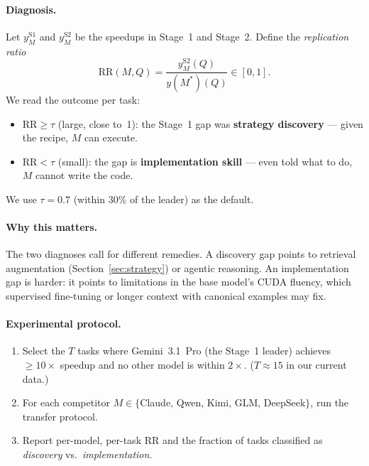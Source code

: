 \documentclass{article}
\begin{document}
\paragraph{Diagnosis.} Let $y^{\mathrm{S1}}_{M}$ and
$y^{\mathrm{S2}}_{M}$ be the speedups in Stage~1 and Stage~2. Define
the \emph{replication ratio}
\begin{equation}
\mathrm{RR}(M, Q) = \frac{y^{\mathrm{S2}}_{M}(Q)}{y(M^*)(Q)}
  \in [0, 1].
\label{eq:rr}
\end{equation}
We read the outcome per task:
\begin{itemize}
  \item $\mathrm{RR} \geq \tau$ (large, close to~1): the Stage~1 gap
        was \textbf{strategy discovery} --- given the recipe, $M$
        can execute.
  \item $\mathrm{RR} < \tau$ (small): the gap is \textbf{implementation
        skill} --- even told what to do, $M$ cannot write the code.
\end{itemize}
We use $\tau = 0.7$ (within $30\%$ of the leader) as the default.

\paragraph{Why this matters.}
The two diagnoses call for different remedies. A discovery gap points
to retrieval augmentation (Section~\ref{sec:strategy}) or agentic
reasoning. An implementation gap is harder: it points to limitations
in the base model's CUDA fluency, which supervised fine-tuning or
longer context with canonical examples may fix.

\paragraph{Experimental protocol.}
\begin{enumerate}
  \item Select the $T$ tasks where Gemini~3.1~Pro (the Stage~1
        leader) achieves $\geq 10\times$ speedup and no other model is
        within $2\times$. ($T \approx 15$ in our current data.)
  \item For each competitor $M \in \{$Claude, Qwen, Kimi, GLM,
        DeepSeek$\}$, run the transfer protocol.
  \item Report per-model, per-task RR and the fraction of tasks
        classified as \emph{discovery} vs.\ \emph{implementation}.
\end{enumerate}
\end{document}
